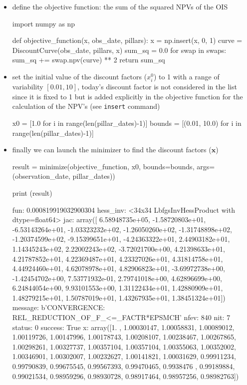 \begin{itemize}
\tightlist
\item
  define the objective function: the sum of the squared NPVs of the OIS

\begin{ipython}
import numpy as np

def objective_function(x, obs_date, pillars):
    x = np.insert(x, 0, 1)
    curve = DiscountCurve(obs_date, pillars, x)
    sum_sq = 0.0
    for swap in swaps:
        sum_sq += swap.npv(curve) ** 2
    return sum_sq
\end{ipython}

\item
  set the initial value of the discount factors (\(x_i^0\)) to 1 with a
  range of variability \([ 0.01, 10]\), today's discount factor is not considered 
  in the list since it is fixed to 1 but is added explicitly in the objective function
  for the calculation of the NPV's (see \texttt{insert} command)

\begin{ipython}
x0 = [1.0 for i in range(len(pillar_dates)-1)]
bounds = [(0.01, 10.0) for i in range(len(pillar_dates)-1)]
\end{ipython}

\item
  finally we can launch the minimizer to find the discount factors
  (\(\mathbf{x}\))

\begin{ipython}
result = minimize(objective_function, x0, bounds=bounds,
                  args=(observation_date, pillar_dates))

print (result)
\end{ipython}
\begin{ioutput}
      fun: 0.000819919032900304
 hess_inv: <34x34 LbfgsInvHessProduct with dtype=float64>
      jac: array([ 6.58948735e+05, -1.58720803e+01, -6.53143264e+01,
-1.03323232e+02,
       -1.26050260e+02, -1.31748898e+02, -1.20374599e+02, -9.15399651e+01,
       -4.24363322e+01,  2.44903182e+01,  1.14345243e+02,  2.22002243e+02,
       -3.72021700e+00,  4.21398633e+01,  4.21787852e+01,  4.22369487e+01,
        4.23327026e+01,  4.31814758e+01,  4.44924460e+01,  4.62078978e+01,
        4.82906823e+01, -3.69972738e+00, -1.42454702e+00,  7.53771932e-01,
        2.79741018e+00,  4.62896699e+00,  6.24844054e+00,  9.93101553e+00,
        1.31122434e+01,  1.42880909e+01,  1.48279215e+01,  1.50787019e+01,
        1.43267935e+01,  1.38451324e+01])
  message: b'CONVERGENCE: REL\_REDUCTION\_OF\_F\_<=\_FACTR*EPSMCH'
     nfev: 840
      nit: 7
   status: 0
  success: True
        x: array([1.        , 1.00030147, 1.00058831, 1.00089012, 1.00119726,
                  1.00147996, 1.00178743, 1.00208107, 1.00238467, 1.00267865,
                  1.00298261, 1.00327737, 1.00357104, 1.00357104, 1.00355063,
                  1.00352002, 1.00346901, 1.00302007, 1.00232627, 1.00141821,
                  1.00031629, 0.99911234, 0.99790839, 0.99675545, 0.99567393,
                  0.99470465, 0.9938476 , 0.99189884, 0.99021534, 0.98959296,
                  0.98930728, 0.98917464, 0.98957256, 0.98982763])
\end{ioutput}
\end{itemize}

